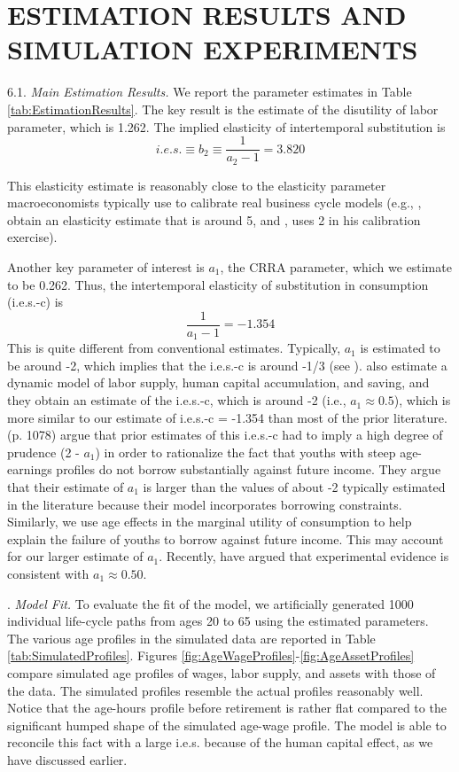 \documentclass[\econtexRoot/ImaiKeane]{subfiles}
\begin{document}
\section{ESTIMATION RESULTS AND SIMULATION EXPERIMENTS}
\label{section:estimation}
6.1.     \textit{Main Estimation Results.}    We report the parameter estimates in Table \ref{tab:EstimationResults}. The key result is the estimate of the disutility of labor parameter, which is 1.262. The implied elasticity of intertemporal substitution is
$$ i.e.s. \equiv b_2 \equiv \dfrac{1}{a_2-1} = 3.820 $$

This elasticity estimate is reasonably close to the elasticity parameter macroeconomists typically use to calibrate real business cycle models (e.g., \cite{Eichenbaum1988-kg}, obtain an elasticity estimate that is around 5, and \cite{Prescott1986-vn}, uses 2 in his calibration exercise). \par
Another key parameter of interest is $a_1$, the CRRA parameter, which we estimate to be 0.262. Thus, the intertemporal elasticity of substitution in consumption (i.e.s.-c) is
$$ \dfrac{1}{a_1-1} = -1.354$$
This is quite different from conventional estimates. Typically, $a_1$ is estimated to be around -2, which implies that the i.e.s.-c is around -1/3 (see \cite{Hubbard1994-qp}). \cite{Keane2001-yk} also estimate a dynamic model of labor supply, human capital accumulation, and saving, and they obtain an estimate of the i.e.s.-c, which is around -2 (i.e., $a_1 \approx 0.5$), which is more similar to our estimate of i.e.s.-c = -1.354 than most of the prior literature. \cite{Keane2001-yk} (p. 1078) argue that prior estimates of this i.e.s.-c had to imply a high degree of prudence (2 - $a_1$) in order to rationalize the fact that youths with steep age-earnings profiles do not borrow substantially against future income. They argue that their estimate of $a_1$ is larger than the values of about -2 typically estimated in the literature because their model incorporates borrowing constraints. Similarly, we use age effects in the marginal utility of consumption to help explain the failure of youths to borrow against future income. This may account for our larger estimate of $a_1$. Recently, \cite{Goeree2000-la} have argued that experimental evidence is consistent with $a_1 \approx 0.50$. \par

.     \textit{Model Fit.}     To evaluate the fit of the model, we artificially generated 1000 individual life-cycle paths from ages 20 to 65 using the estimated parameters. The various age profiles in the simulated data are reported in Table \ref{tab:SimulatedProfiles}. Figures \ref{fig:AgeWageProfiles}-\ref{fig:AgeAssetProfiles} compare simulated age profiles of wages, labor supply, and assets with those of the data. The simulated profiles resemble the actual profiles reasonably well. Notice that the age-hours profile before retirement is rather flat compared to the significant humped shape of the simulated age-wage profile. The model is able to reconcile this fact with a large i.e.s. because of the human capital effect, as we have discussed earlier. \par
\end{document}

